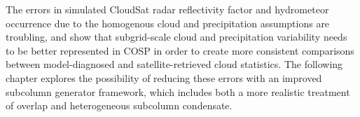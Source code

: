 The errors in simulated CloudSat radar reflectivity factor and
hydrometeor occurrence due to the homogenous cloud and precipitation
assumptions are troubling, and show that subgrid-scale cloud and
precipitation variability needs to be better represented in COSP in
order to create more consistent comparisons between model-diagnosed and
satellite-retrieved cloud statistics. The following chapter explores the
possibility of reducing these errors with an improved subcolumn
generator framework, which includes both a more realistic treatment of
overlap and heterogeneous subcolumn condensate.
